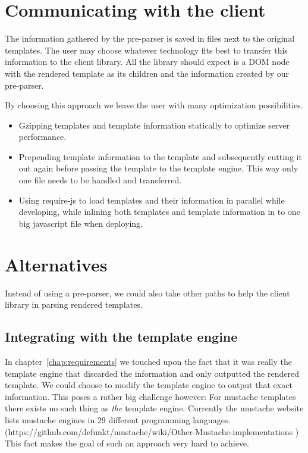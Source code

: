 \section{Communicating with the client}

The information gathered by the pre-parser is saved in files next to the
original templates. The user may choose whatever technology fits best to
transfer this information to the client library. All the library should expect
is a DOM node with the rendered template as its children and the information
created by our pre-parser.

By choosing this approach we leave the user with many optimization
possibilities.
\begin{itemize}
\item Gzipping templates and template information statically to optimize
      server performance.
\item Prepending template information to the template and subsequently
      cutting it out again before passing the template to the template
      engine. This way only one file needs to be handled and transferred.
\item Using require-js to load templates and their information in parallel
      while developing, while inlining both templates and template information
      in to one big javascript file when deploying.
\end{itemize}

\section{Alternatives}

Instead of using a pre-parser, we could also take other paths to help
the client library in parsing rendered templates.

\subsection{Integrating with the template engine}

In chapter~\ref{chap:requirements} we touched upon the fact that it was really
the template engine that discarded the information and only outputted the
rendered template. We could choose to modify the template engine to output that
exact information. This poses a rather big challenge however:
For mustache templates there exists no such thing as \emph{the} template engine.
Currently the mustache website lists mustache engines in 29 different
programming languages. (https://github.com/defunkt/mustache/wiki/Other-Mustache-implementations )
This fact makes the goal of such an approach very hard to achieve.

